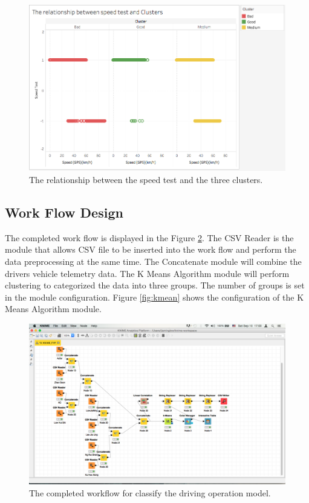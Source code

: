 \begin{figure}[hbt!]\centering
\includegraphics[height=.5\textwidth]{image/clusterresult}
\caption{The relationship between the speed test and the three clusters.}
\label{fig:cluster_result}
\end{figure}


\subsection{Work Flow Design}
The completed work flow is displayed in the Figure \ref{fig:workflow}. The CSV Reader is the module that allows CSV file to be inserted into the work flow and perform the data preprocessing at the same time. The Concatenate module will combine the drivers vehicle telemetry data. The K Means Algorithm module will perform clustering to categorized the data into three groups. The number of groups is set in the module configuration. Figure \ref{fig:kmean} shows the configuration of the K Means Algorithm module.

\begin{figure}[hbt!]\centering
\includegraphics[width=.75\textwidth]{image/KNIMEfile}
\caption{The completed workflow for classify the driving operation model.}
\label{fig:workflow}
\end{figure}

